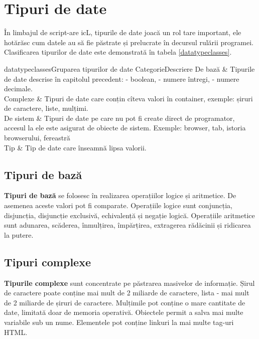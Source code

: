\section{Tipuri de date}

În limbajul de script-are icL, tipurile de date joacă un rol tare important, ele hotărăsc cum datele au să fie păstrate și prelucrate în decursul rulării programei. Clasificarea tipurilor de date este demonstrată în tabela \ref{datatypeclasses}.

\stabletwo{3.5cm}{13.6cm}
{datatypeclasses}{Gruparea tipurilor de date}
{Categorie}{Descriere}
{
	De bază     & Tipurile de date descrise în capitolul precedent: \bool{} - boolean, \integer{} - numere întregi, \double{} - numere decimale. \\ \hline
	Complexe    & Tipuri de date care conțin cîteva valori în container, exemple: șiruri de caractere, liste, mulțimi. \\ \hline
	De sistem   & Tipuri de date pe care nu pot fi create direct de programator, accesul la ele este asigurat de obiecte de sistem. Exemple: browser, tab, istoria browserului, fereastră \\ \hline
	Tip \void{} & Tip de date care înseamnă lipsa valorii.
}

\subsection{Tipuri de bază}

{\bf Tipuri de bază} se folosesc în realizarea operațiilor logice și aritmetice. De asemenea aceste valori pot fi comparate. Operațiile logice sunt conjuncția, disjuncția, disjuncție exclusivă, echivalență și negație logică. Operațiile aritmetice sunt adunarea, scăderea, înmulțirea, împărțirea, extragerea rădăcinii și ridicarea la putere.

\subsection{Tipuri complexe}

{\bf Tipurile complexe} sunt concentrate pe păstrarea masivelor de informație. Șirul de caractere poate conține mai mult de 2 miliarde de caractere, lista - mai mult de 2 miliarde de șiruri de caractere. Mulțimile pot conține o mare cantitate de date, limitată doar de memoria operativă. Obiectele permit a salva mai multe variabile sub un nume. Elementele pot conține linkuri la mai multe tag-uri HTML.

